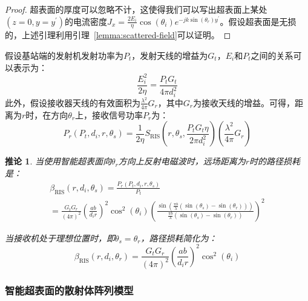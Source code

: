\documentclass[supercite]{HustGraduPaper}
\newtheorem{corollary}{\indent 推论}[section]
\begin{document}
\begin{proof}
	超表面的厚度可以忽略不计，这使得我们可以写出超表面上某处$(z=0, y=y^\prime)$的电流密度$J_{x}=\frac{2 E_{i}}{\eta} \cos \left(\theta_{i}\right) e^{-j k \sin \left(\theta_{r}\right) y^{\prime}}$。假设超表面是无损的，上述引理利用引理~\ref{lemma:scattered-field}可以证明。
\end{proof}

假设基站端的发射机发射功率为$P_t$，发射天线的增益为$G_t$，$E_i$和$P_t$之间的关系可以表示为：
\begin{equation}
	\frac{E_{i}^{2}}{2 \eta}=\frac{P_{t} G_{t}}{4 \pi d_{i}^{2}}
\end{equation}
此外，假设接收器天线的有效面积为$\frac{\lambda^2}{4\pi} G_r$，其中$G_r$为接收天线的增益。可得，距离为$r$时，在方向$\theta_r$上，接收信号功率$P_r$为：
\begin{equation}
	P_{r}\left(P_{t}, d_{i}, r, \theta_{s}\right)=\frac{1}{2 \eta} S_{\mathrm{RIS}}\left(r, \theta_{s}, \frac{P_{t} G_{t} \eta}{2 \pi d_{i}^{2}}\right)\left(\frac{\lambda^{2}}{4 \pi} G_{r}\right)
\end{equation}

\begin{corollary}
	当使用智能超表面向$\theta_r$方向上反射电磁波时，远场距离为$r$时的路径损耗是：
	\begin{equation}
		\begin{array}{l}
			\beta_{\mathrm{RIS}}\left(r, d_{i}, \theta_{s}\right)=\frac{P_{r}\left(P_{t}, d_{i}, r, \theta_{s}\right)}{P_{t}} \\
			=\frac{G_{t} G_{r}}{(4 \pi)^{2}}\left(\frac{a b}{d_{i} r}\right)^{2} \cos ^{2}\left(\theta_{i}\right)\left(\frac{\sin \left(\frac{\pi b}{\lambda}\left(\sin \left(\theta_{s}\right)-\sin \left(\theta_{r}\right)\right)\right)}{\frac{\pi b}{\lambda}\left(\sin \left(\theta_{s}\right)-\sin \left(\theta_{r}\right)\right)}\right)^{2}
		\end{array}
	\end{equation}

	当接收机处于理想位置时，即$\theta_s=\theta_r$，路径损耗简化为：
	\begin{equation}
		\beta_{\mathrm{RIS}}\left(r, d_{i}, \theta_{r}\right)=\frac{G_{t} G_{r}}{(4 \pi)^{2}}\left(\frac{a b}{d_{i} r}\right)^{2} \cos ^{2}\left(\theta_{i}\right)
	\end{equation}
\end{corollary}

\subsubsection{智能超表面的散射体阵列模型}
\end{document}
